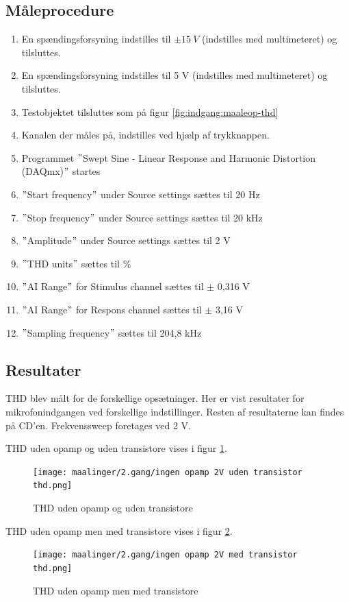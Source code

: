 \subsection*{Måleprocedure}
\begin{enumerate}
\item En spændingsforsyning indstilles til $\pm15~V$ (indstilles med multimeteret) og tilsluttes.
\item En spændingsforsyning indstilles til 5 V (indstilles med multimeteret) og tilsluttes.
\item Testobjektet tilsluttes som på figur \ref{fig:indgang:maaleop-thd}
\item Kanalen der måles på, indstilles ved hjælp af trykknappen.
\item Programmet $"$Swept Sine - Linear Response and Harmonic Distortion (DAQmx)$"$ startes
\item $"$Start frequency$"$ under Source settings sættes til 20 Hz
\item $"$Stop frequency$"$ under Source settings sættes til 20 kHz
\item $"$Amplitude$"$ under Source settings sættes til 2 V
\item $"$THD units$"$ sættes til \%
\item $"$AI Range$"$ for Stimulus channel sættes til $\pm$ 0,316 V
\item $"$AI Range$"$ for Respons channel sættes til $\pm$ 3,16 V
\item $"$Sampling frequency$"$ sættes til 204,8 kHz
\end{enumerate}

\subsection*{Resultater}

THD blev målt for de forskellige opsætninger. Her er vist resultater for mikrofonindgangen ved forskellige indstillinger. Resten af resultaterne kan findes på CD'en. Frekvenssweep foretages ved 2 V.

THD uden opamp og uden transistore vises i figur \ref{fig:apind:uoput}.
\begin{figure}[h]
\centering
\texttt{[image: maalinger/2.gang/ingen opamp 2V uden transistor thd.png]}
\caption{THD uden opamp og uden transistore}
\label{fig:apind:uoput}
\end{figure}

THD uden opamp men med transistore vises i figur \ref{fig:apind:uopmt}.
\begin{figure}[h]
\centering
\texttt{[image: maalinger/2.gang/ingen opamp 2V med transistor thd.png]}
\caption{THD uden opamp men med transistore}
\label{fig:apind:uopmt}
\end{figure}

